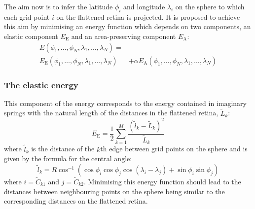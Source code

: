 \documentclass{article}
\newcommand{\EE}{\ensuremath{E_\mathrm{E}}\xspace}
\begin{document}
The aim now is to infer the latitude $\phi_i$ and longitude
$\lambda_i$ on the sphere to which each grid point $i$ on the
flattened retina is projected.  It is proposed to achieve this aim by
minimising an energy function which depends on two components, an
elastic component $E_\mathrm{E}$ and an area-preserving component
$E_\mathrm{A}$:
\begin{equation}
  \begin{split}
  E(\phi_1,\dots,\phi_N,\lambda_1,\dots,\lambda_N) = & \\
  E_\mathrm{E}(\phi_1,\dots,\phi_N,\lambda_1,\dots,\lambda_N) 
  & + \alpha E_\mathrm{A}(\phi_1,\dots,\phi_N,\lambda_1,\dots,\lambda_N) 
  \end{split}
\end{equation}


\subsubsection{The elastic energy}
\label{fold-sphere:sec:elastic-force}

This component of the energy corresponds to the energy contained in
imaginary springs with the natural length of the distances in the
flattened retina, $\tilde L_k$:
\begin{equation}
  \label{fold-sphere:eq:5}
  \EE  = \frac{1}{2} \sum_{k=1}^{\tilde M} \frac{(\tilde l_k- \tilde
    L_k)^2}{\tilde L_k}
\end{equation}
where $\tilde l_k$ is the distance of the $k$th edge between grid points on
the sphere and is given by the formula for the central angle:
\begin{equation}
  \label{fold-sphere:eq:2}
  \tilde l_k = R\cos^{-1}(\cos\phi_i\cos\phi_j\cos(\lambda_i-\lambda_j) + \sin\phi_i\sin\phi_j)
\end{equation}
where $i=\tilde C_{k1}$ and $j=\tilde C_{k2}$.  Minimising this energy
function should lead to the distances between neighbouring points on
the sphere being similar to the corresponding distances on the
flattened retina.
\end{document}
